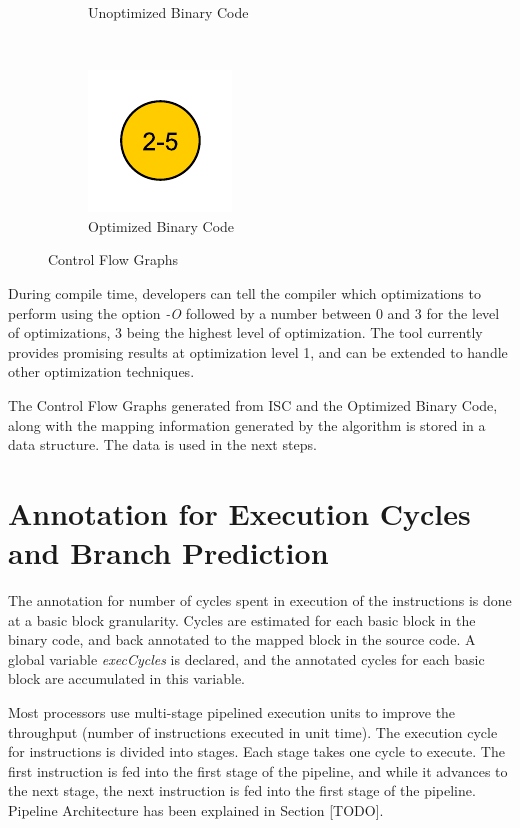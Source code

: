 \begin{figure}
\begin{subfigure}[t]{.33\textwidth}
\caption{Unoptimized Binary Code}
\label{fig:cfgUnopt}
\end{subfigure}%
~
\begin{subfigure}[t]{.33\textwidth}
\centering
\captionsetup{margin=10pt}
\includegraphics[width=.5\textwidth]{figures/CondExecObjOptFlowChart.pdf}
\caption{Optimized Binary Code}
\label{fig:cfgOpt}
\end{subfigure}
\caption{Control Flow Graphs}
\end{figure}

During compile time, developers can tell the compiler which optimizations to perform using the option \emph{-O} followed by a number between 0 and 3 for the level of optimizations, 3 being the highest level of optimization. The tool currently provides promising results at optimization level 1, and can be extended to handle other optimization techniques.

The Control Flow Graphs generated from ISC and the Optimized Binary Code, along with the mapping information generated by the algorithm is stored in a data structure. The data is used in the next steps.

\section{Annotation for Execution Cycles and Branch Prediction}
The annotation for number of cycles spent in execution of the instructions is done at a basic block granularity. Cycles are estimated for each basic block in the binary code, and back annotated to the mapped block in the source code. A global variable \emph{execCycles} is declared, and the annotated cycles for each basic block are accumulated in this variable.

Most processors use multi-stage pipelined execution units to improve the throughput (number of instructions executed in unit time). The execution cycle for instructions is divided into stages. Each stage takes one cycle to execute. The first instruction is fed into the first stage of the pipeline, and while it advances to the next stage, the next instruction is fed into the first stage of the pipeline. Pipeline Architecture has been explained in Section [TODO].

